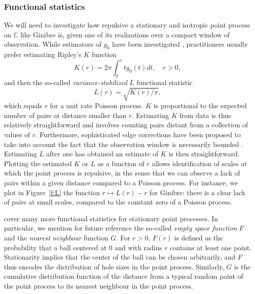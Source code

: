 \subsubsection{Functional statistics}
\label{s:LAndK}
We will need to investigate how repulsive a stationary and isotropic point
process on $\mathbb{C}$ like Ginibre is, given one of its realizations over a compact
window of observation. While estimators of $g_0$ have been investigated
\cite[Section 4.3]{MoWa03}, practitioners usually prefer estimating Ripley's $K$
function
$$
K(r) = 2\pi\int_{0}^r t g_0(t)dt, \quad r>0,
$$
and then the so-called \emph{variance-stabilized} $L$ functional statistic
$$
L(r) = \sqrt{K(r)/\pi},
$$
which equals $r$ for a unit rate Poisson process. $K$ is proportional to the
expected number of pairs at distance smaller than $r$. Estimating $K$ from data
is thus relatively straightforward and involves counting pairs distant from a
collection of values of $r$. Furthermore, sophisticated edge corrections have
been proposed to take into account the fact that the observation window is
necessarily bounded \cite[Section 4.3]{MoWa03}. Estimating $L$ after one has
obtained an estimate of $K$ is then
straightforward. Plotting the estimated $K$ or $L$ as a
function of $r$ allows identification of scales at which the point process is
repulsive, in the sense that we can observe a lack of pairs within a given
distance compared to a Poisson process. For instance, we plot in
Figure~\ref{f:L} the function $r\mapsto L(r)-r$ for Ginibre: there is a clear
lack of pairs at small scales, compared to the constant zero of a Poisson
process. 

\cite[Section 4.2]{MoWa03} cover many more functional statistics for stationary point processes. In particular, we mention for future reference the
so-called \emph{empty space function} $F$ and the \emph{nearest neighbour}
function $G$. For $r>0$, $F(r)$ is
defined as the probability that a ball centered at $0$ and with radius $r$
contains at least one point. Stationarity implies that the center of the ball
can be chosen arbitrarily, and $F$ thus encodes the distribution of hole sizes
in the point process. Similarly, $G$ is the cumulative distribution function of
the distance from a typical random point of the point process to its nearest
neighbour in the point process. 




